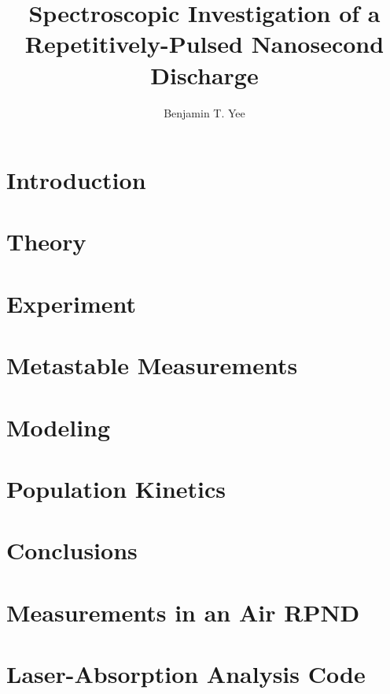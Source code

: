 \documentclass[12pt]{./tex/thesis-umich}
\title{Spectroscopic Investigation of a Repetitively-Pulsed Nanosecond Discharge}
\author{Benjamin T. Yee}
\begin{document}
  \chapter{Introduction}\label{chp:introduction}
    
  
  \chapter{Theory}\label{chp:theory}
    

  \chapter{Experiment}\label{chp:experiment}
    

  \chapter{Metastable Measurements}\label{chp:metastables}
    
  
  \chapter{Modeling}\label{chp:modeling}
    

  \chapter{Population Kinetics}\label{chp:emissions}
    

  \chapter{Conclusions}\label{chp:conclusions}
    

  \appendix
    \chapter{Measurements in an Air RPND}\label{chp:nasa}
      

    \chapter{Laser-Absorption Analysis Code}\label{chp:lasana}
      
\end{document}
